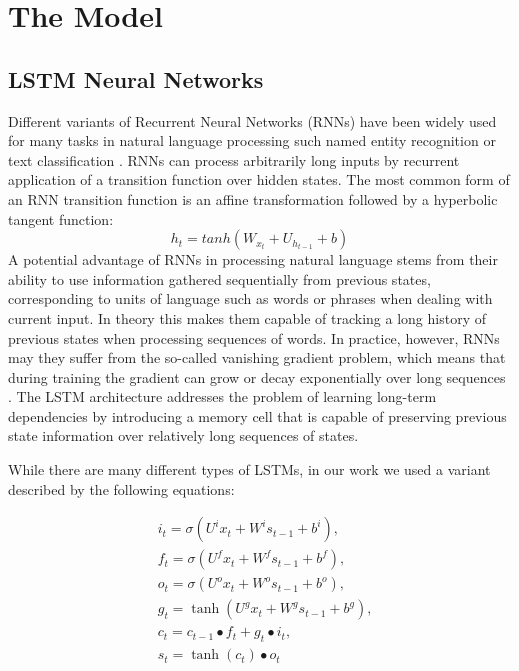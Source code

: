 \documentclass[10pt, a4paper]{article}
\begin{document}
\section{The Model} 


\subsection{LSTM Neural Networks}

Different variants of Recurrent Neural Networks (RNNs) have been widely used for many tasks in natural language processing such named entity recognition \cite{lample2016neural} or text classification \cite{lai2015recurrent}. RNNs can process arbitrarily long inputs by recurrent application of a transition function over hidden states. The most common form of an RNN transition function is an affine transformation followed by a hyperbolic tangent function:
	\begin{equation} h_t = tanh(W_{x_t}+U_{h_{t-1}}+b)
\end{equation}
	A potential advantage of RNNs in processing natural language stems from their ability to use information gathered sequentially from previous states, corresponding to units of language such as words or phrases when dealing with current input. In theory this makes them capable of tracking a long history of previous states when processing sequences of words. In practice, however, RNNs may they suffer from the so-called vanishing gradient problem, which means that during training the gradient can grow or decay exponentially over long sequences \cite{bengio1994learning,hochreiter1998vanishing}. The LSTM architecture \cite{hochreiter1997long} addresses the problem of learning long-term dependencies by introducing a memory cell that is capable of preserving previous state information over relatively long sequences of states.
\par While there are many different types of LSTMs, in our work we used a variant described by the following equations:
		
\begin{equation}
\begin{split}
		&i_t = \sigma(U^i{x_t} + W^is_{t-1} + b^i) ,\\
		&f_t = \sigma(U^f{x_t} + W^fs_{t-1} + b^f) ,\\
		&o_t = \sigma(U^o{x_t} + W^os_{t-1} + b^o) ,\\
		&g_t = \tanh(U^g{x_t}+ W^gs_{t-1} + b^g) ,\\
		&c_t = c_{t-1} \bullet f_t + g_t \bullet i_t ,\\
		&s_t = \tanh(c_t) \bullet o_t 
\end{split}
\end{equation}
\end{document}
